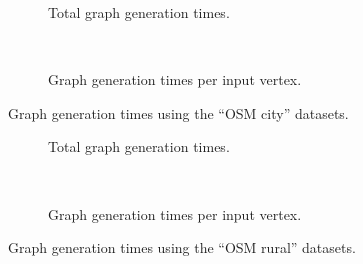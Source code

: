			\begin{figure}[h!]
				\begin{minipage}{.48\textwidth}
					\begin{subfigure}[t]{\linewidth}
						\begin{figcenter}
							
						\end{figcenter}
						\caption{Total graph generation times.}
						\label{fig:eval-import-city-abs}
					\end{subfigure}
					\\[3ex]
					\begin{subfigure}[t]{\linewidth}
						\begin{figcenter}
							
						\end{figcenter}
						\caption{Graph generation times per input vertex.}
						\label{fig:eval-import-city-rel}
					\end{subfigure}
					\caption{Graph generation times using the \enquote{OSM city} datasets.}
					\label{fig:eval-import-city}
				\end{minipage}
				\hfill
				\begin{minipage}{.48\textwidth}
					\begin{subfigure}[t]{\linewidth}
						\begin{figcenter}
							
						\end{figcenter}
						\caption{Total graph generation times.}
						\label{fig:eval-import-rural-abs}
					\end{subfigure}
					\\[3ex]
					\begin{subfigure}[t]{\linewidth}
						\begin{figcenter}
							
						\end{figcenter}
						\caption{Graph generation times per input vertex.}
						\label{fig:eval-import-rural-rel}
					\end{subfigure}
					\caption{Graph generation times using the \enquote{OSM rural} datasets.}
					\label{fig:eval-import-rural}
				\end{minipage}
			\end{figure}
			
